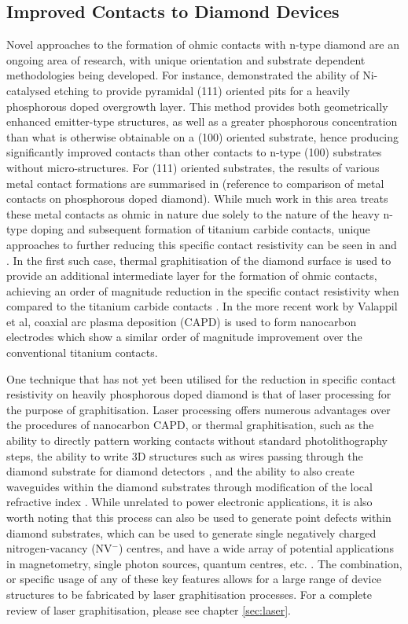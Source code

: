 \begin{refsection}
\subsection{Improved Contacts to Diamond Devices}
Novel approaches to the formation of ohmic contacts with n-type diamond are an ongoing area of research, with unique orientation and substrate dependent methodologies being developed. For instance, \cite{temahuki2017} demonstrated the ability of Ni-catalysed etching to provide pyramidal \hkl(111) oriented pits for a heavily phosphorous doped overgrowth layer. This method provides both geometrically enhanced emitter-type structures, as well as a greater phosphorous concentration than what is otherwise obtainable on a \hkl(100) oriented substrate, hence producing significantly improved contacts than other contacts to n-type \hkl(100) substrates without micro-structures. For \hkl(111) oriented substrates, the results of various metal contact formations are summarised in (reference to comparison of metal contacts on phosphorous doped diamond). While much work in this area treats these metal contacts as ohmic in nature due solely to the nature of the heavy n-type doping and subsequent formation of titanium carbide contacts, unique approaches to further reducing this specific contact resistivity can be seen in \cite{matsumoto2013} and \cite{valappil2022, valappil2023}. In the first such case, thermal graphitisation of the diamond surface is used to provide an additional intermediate layer for the formation of ohmic contacts, achieving an order of magnitude reduction in the specific contact resistivity when compared to the titanium carbide contacts \cite{matsumoto2013}. In the more recent work by Valappil et al, coaxial arc plasma deposition (CAPD) is used to form nanocarbon electrodes which show a similar order of magnitude improvement over the conventional titanium contacts.

One technique that has not yet been utilised for the reduction in specific contact resistivity on heavily phosphorous doped diamond is that of laser processing for the purpose of graphitisation. Laser processing offers numerous advantages over the procedures of nanocarbon CAPD, or thermal graphitisation, such as the ability to directly pattern working contacts without standard photolithography steps, the ability to write 3D structures such as wires passing through the diamond substrate for diamond detectors \cite{bloomer2020}, and the ability to also create waveguides within the diamond substrates through modification of the local refractive index \cite{courvoisier2016}. While unrelated to power electronic applications, it is also worth noting that this process can also be used to generate point defects within diamond substrates, which can be used to generate single negatively charged nitrogen-vacancy (NV$^{-}$) centres, and have a wide array of potential applications in magnetometry, single photon sources, quantum centres, etc. \cite{chen2016}. The combination, or specific usage of any of these key features allows for a large range of device structures to be fabricated by laser graphitisation processes. For a complete review of laser graphitisation, please see chapter \ref{sec:laser}.


\end{refsection}
